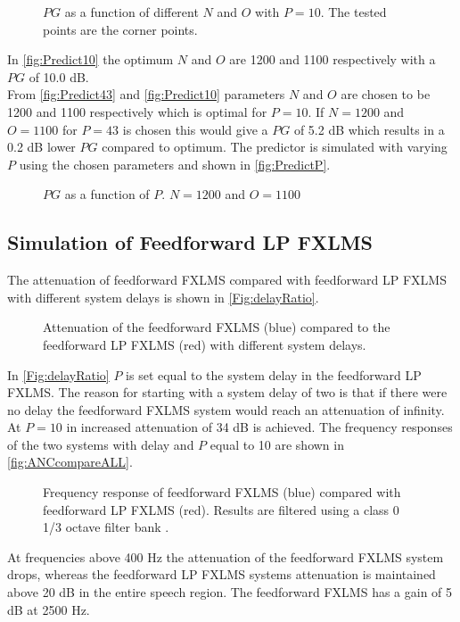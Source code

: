 \begin{figure}[H]
	\centering
	
	\caption{$PG$ as a function of different $N$ and $O$ with $P=10$. The tested points are the corner points.}
	\label{fig:Predict10}
\end{figure}
In \autoref{fig:Predict10} the optimum $N$ and $O$ are 1200 and 1100 respectively with a $PG$ of 10.0 dB.\\

From \autoref{fig:Predict43} and \autoref{fig:Predict10} parameters $N$ and $O$ are chosen to be 1200 and 1100 respectively which is optimal for $P=10$. If $N=1200$ and $O=1100$ for $P=43$ is chosen this would give a $PG$ of 5.2 dB which results in a 0.2 dB lower $PG$ compared to optimum.
The predictor is simulated with varying $P$ using the chosen parameters and shown in \autoref{fig:PredictP}.

\begin{figure}[H]
	\centering
	
	\caption{$PG$ as a function of $P$. $N=1200$ and $O=1100$}
	\label{fig:PredictP}
\end{figure}



\subsection{Simulation of Feedforward LP FXLMS}
The attenuation of feedforward FXLMS compared with feedforward LP FXLMS with different system delays is shown in \autoref{Fig:delayRatio}.
\begin{figure}[H]
	\centering
	
	\caption{Attenuation of the feedforward FXLMS (blue)  compared to the feedforward LP FXLMS (red) with different system delays.}
	\label{Fig:delayRatio}
\end{figure}
In \autoref{Fig:delayRatio} $P$ is set equal to the system delay in the feedforward LP FXLMS. The reason for starting with a system delay of two is that if there were no delay the feedforward FXLMS system would reach an attenuation of infinity. At $P=10$ in increased attenuation of 34 dB is achieved. The frequency responses of the two systems with delay and $P$ equal to 10 are shown in \autoref{fig:ANCcompareALL}.  

\begin{figure}[H]
	\centering
	
	\caption{Frequency response of feedforward FXLMS (blue) compared with feedforward LP FXLMS (red). Results are filtered using a class 0 1/3 octave filter bank \cite{OctaveBand}.}
	\label{fig:ANCcompareALL}
\end{figure}        
At frequencies above 400 Hz the attenuation of the feedforward FXLMS system drops, whereas the feedforward LP FXLMS systems attenuation is maintained above 20 dB in the entire speech region. The feedforward FXLMS has a gain of 5 dB at 2500 Hz.  
        




